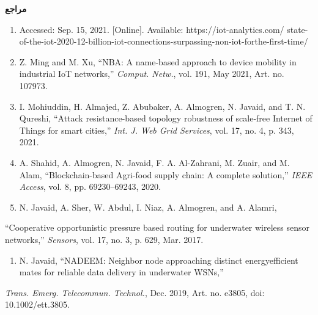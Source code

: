 \documentclass{article} %
\begin{document}
\noindent \textbf{مراجع }

\begin{enumerate}
\item \textbf{ }Accessed: Sep. 15, 2021. [Online]. Available: https://iot-analytics.com/ state-of-the-iot-2020-12-billion-iot-connections-surpassing-non-iot-forthe-first-time/

\item  Z. Ming and M. Xu, ``NBA: A name-based approach to device mobility in industrial IoT networks,'' \textit{Comput. Netw.}, vol. 191, May 2021, Art. no. 107973.

\item  I. Mohiuddin, H. Almajed, Z. Abubaker, A. Almogren, N. Javaid, and T. N. Qureshi, ``Attack resistance-based topology robustness of scale-free Internet of Things for smart cities,'' \textit{Int. J. Web Grid Services}, vol. 17, no. 4, p. 343, 2021.

\item  A. Shahid, A. Almogren, N. Javaid, F. A. Al-Zahrani, M. Zuair, and M. Alam, ``Blockchain-based Agri-food supply chain: A complete solution,'' \textit{IEEE Access}, vol. 8, pp. 69230--69243, 2020.

\item  N. Javaid, A. Sher, W. Abdul, I. Niaz, A. Almogren, and A. Alamri,
\end{enumerate}

\noindent ``Cooperative opportunistic pressure based routing for underwater wireless sensor networks,'' \textit{Sensors}, vol. 17, no. 3, p. 629, Mar. 2017.

\begin{enumerate}
\item  N. Javaid, ``NADEEM: Neighbor node approaching distinct energyefficient mates for reliable data delivery in underwater WSNs,''
\end{enumerate}

\noindent \textit{Trans. Emerg. Telecommun. Technol.}, Dec. 2019, Art. no. e3805, doi: 10.1002/ett.3805.
\end{document}
